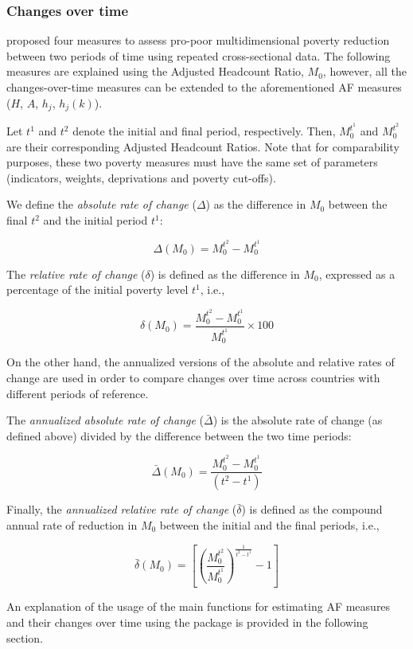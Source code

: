 \subsubsection{Changes over time}\label{changes-over-time}

\citet{COT-mpi} proposed four measures to assess pro-poor multidimensional poverty reduction between two periods of time using repeated cross-sectional data. The following measures are explained using the Adjusted Headcount Ratio, \(M_0\), however, all the changes-over-time measures can be extended to the aforementioned AF measures (\(H\), \(A\), \(h_j\), \(h_j(k)\)).

Let \(t^1\) and \(t^2\) denote the initial and final period, respectively. Then, \(M_0^{t^1}\) and \(M_0^{t^2}\) are their corresponding Adjusted Headcount Ratios. Note that for comparability purposes, these two poverty measures must have the same set of parameters (indicators, weights, deprivations and poverty cut-offs).

We define the \emph{absolute rate of change} (\(\Delta\)) as the difference in \(M_0\) between the final \(t^2\) and the initial period \(t^1\):

\[
\Delta(M_0) = M_0^{t^2} - M_0^{t^1} 
\]

The \emph{relative rate of change} (\(\delta\)) is defined as the difference in \(M_0\), expressed as a percentage of the initial poverty level \(t^1\), i.e.,

\[
\delta(M_0) = \frac{M_0^{t^2} - M_0^{t^1}}{M_0 ^{t^1}} \times 100
\]

On the other hand, the annualized versions of the absolute and relative rates of change are used in order to compare changes over time across countries with different periods of reference.

The \emph{annualized absolute rate of change} (\(\bar{\Delta}\)) is the absolute rate of change (as defined above) divided by the difference between the two time periods:

\[
\bar{\Delta}(M_0) = \frac{M_0^{t^2} - M_0^{t^1}}{(t^2 - t^1)}
\]

Finally, the \emph{annualized relative rate of change} (\(\bar{\delta}\)) is defined as the compound annual rate of reduction in \(M_0\) between the initial and the final periods, i.e.,

\[
\bar{\delta}(M_0) = \left[ \left( \frac{M_0^{t^2}}{M_0^{t^1}} \right)^{\frac{1}{t^2 - t^1}} - 1 \right]
\]

An explanation of the usage of the main functions for estimating AF measures and their changes over time using the  package is provided in the following section.

